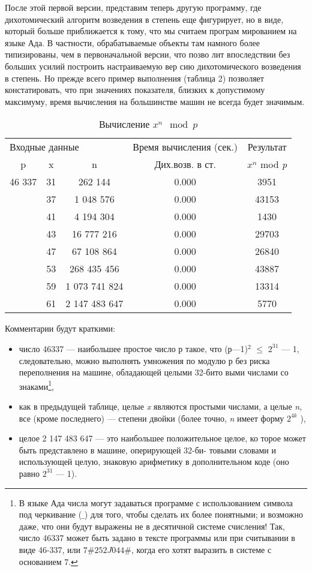 \documentclass{mai_book}
\begin{document}
\noindent После этой первой версии, представим теперь другую программу, где
дихотомический алгоритм возведения в степень еще фигурирует, но в
виде, который больше приближается к тому, что мы считаем програм­
мированием на языке Ада. В частности, обрабатываемые объекты там
намного более типизированы, чем в первоначальной версии, что позво­
лит впоследствии без больших усилий построить настраиваемую вер­
сию дихотомического возведения в степень. Но прежде всего пример
выполнения (таблица 2) позволяет констатировать, что при значениях
показателя, близких к допустимому максимуму, время вычисления на
большинстве машин не всегда будет значимым.
\begin{table}
\centering
\begin{tabular}{|*{5}{c|}}
\hline 
\multicolumn{3}{l}{Входные данные} & {Время вычисления (сек.)} & Результат\\
p & x & n &  Дих.возв. в ст. & $x^n$ mod {\it p}\\ 
\hline
46 337  & 31 & 262 144 & 0.000 & 3951\\
 & 37 & 1 048 576&  0.000 & 43153\\
 & 41 & 4 194 304  & 0.000 & 1430\\
 & 43 & 16 777 216 &  0.000 & 29703\\
 & 47 & 67 108 864  & 0.000 & 26840\\
 & 53 & 268 435 456  & 0.000 & 43887\\
 & 59 & 1 073 741 824 & 0.000 & 13314\\
 & 61 & 2 147 483 647 & 0.000 & 5770\\
\hline
\end{tabular}
\caption{ Вычисление ${x^n}\mod{p}$}
\end{table}

Комментарии будут краткими:
\begin{itemize}
\item число 46337 — наибольшее простое число р такое, что (р—1)$^2$ $\leqslant$
$2^{31}$ — 1, следовательно, можно выполнять умножения по модулю р
без риска переполнения на машине, обладающей целыми 32-бито­
выми числами со знаками\footnote{В языке Ада числа могут задаваться программе с использованием символа под­
черкивание ($\_$) для того, чтобы сделать их более понятными; и возможно даже,
что они будут выражены не в десятичной системе счисления! Так, число 46337
может быть задано в тексте программы или при считывании в виде 46-337, или
$7\# 252J044\#$, когда его хотят выразить в системе с основанием 7.},
\item как в предыдущей таблице, целые {\it x} являются простыми числами,
а целые {\it n}, все (кроме последнего) — степени двойки (более точно,
{\it n} имеет форму $2^{4k}$ ),
\item целое 2 147 483 647 — это наибольшее положительное целое, ко­
торое может быть представлено в машине, оперирующей 32-би-
товыми словами и использующей целую, знаковую арифметику в
дополнительном коде (оно равно $2^{31}$ — 1).
\end{itemize}
\end{document}
